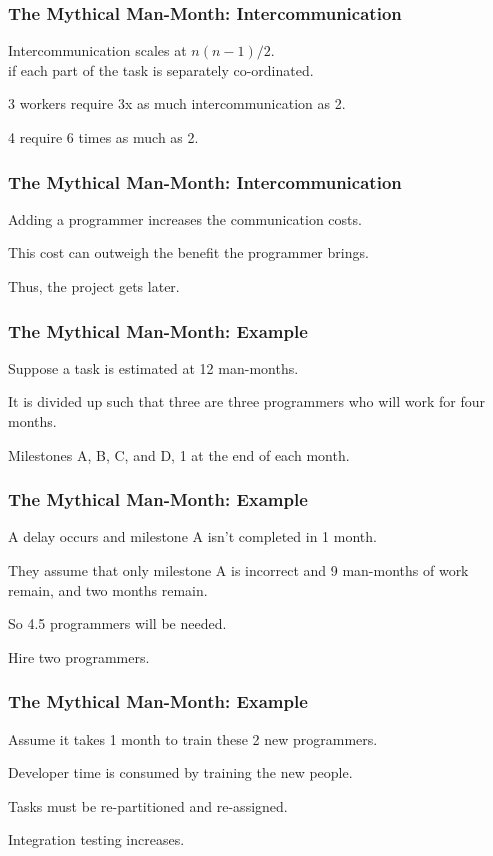 \begin{frame}
\frametitle{The Mythical Man-Month: Intercommunication}
\begin{changemargin}{1cm}

Intercommunication scales at $n (n - 1) / 2$. \\
\quad if each part of the task is separately co-ordinated.

3 workers require 3x as much intercommunication as 2.

4 require 6 times as much as 2. 

\end{changemargin}
\end{frame}

\begin{frame}
\frametitle{The Mythical Man-Month: Intercommunication}
\begin{changemargin}{1cm}
Adding a programmer increases the communication costs.

This cost can outweigh the benefit the programmer brings.

Thus, the project gets later.
\end{changemargin}
\end{frame}


\begin{frame}
\frametitle{The Mythical Man-Month: Example}
\begin{changemargin}{1cm}
Suppose a task is estimated at 12 man-months.

It is divided up such that three are three programmers who will work for four months. 

Milestones A, B, C, and D, 1 at the end of each month. 

\end{changemargin}
\end{frame}

\begin{frame}
\frametitle{The Mythical Man-Month: Example}
\begin{changemargin}{1cm}
A delay occurs and milestone A isn't completed in 1 month.


They assume that only milestone A is incorrect and 9 man-months of work remain, and two months remain. 

So 4.5 programmers will be needed. 

Hire two programmers. 
\end{changemargin}
\end{frame}

\begin{frame}
\frametitle{The Mythical Man-Month: Example}
\begin{changemargin}{1cm}
Assume it takes 1 month to train these 2 new programmers.

Developer time is consumed by training the new people.

Tasks must be re-partitioned and re-assigned.

Integration testing increases.

\end{changemargin}
\end{frame}

